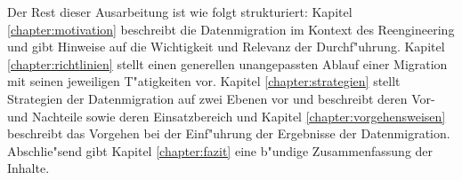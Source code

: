 \lb
Der Rest dieser Ausarbeitung ist wie folgt strukturiert: Kapitel \ref{chapter:motivation} beschreibt die Datenmigration im Kontext des Reengineering und gibt Hinweise auf die Wichtigkeit und Relevanz der Durchf"uhrung. Kapitel \ref{chapter:richtlinien} stellt einen generellen unangepassten Ablauf einer Migration mit seinen jeweiligen T"atigkeiten vor. Kapitel \ref{chapter:strategien} stellt Strategien der Datenmigration auf zwei Ebenen vor und beschreibt deren Vor- und Nachteile sowie deren Einsatzbereich und Kapitel \ref{chapter:vorgehensweisen} beschreibt das Vorgehen bei der Einf"uhrung der Ergebnisse der Datenmigration. Abschlie"send gibt Kapitel \ref{chapter:fazit} eine b"undige Zusammenfassung der Inhalte.